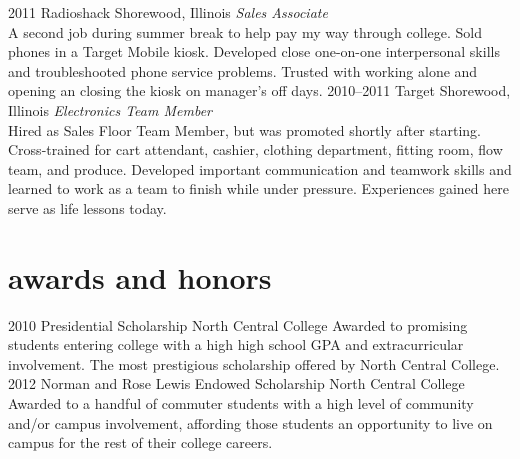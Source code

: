 \documentclass[]{friggeri-cv} %
\begin{document}
\begin{entrylist}
\entry
{2011}
{Radioshack}
{Shorewood, Illinois}
{\emph{Sales Associate} \\
A second job during summer break to help pay my way through college.
Sold phones in a Target Mobile kiosk.
Developed close one-on-one interpersonal skills and troubleshooted phone service problems.
Trusted with working alone and opening an closing the kiosk on manager's off days.}
\entry
{2010--2011}
{Target}
{Shorewood, Illinois}
{\emph{Electronics Team Member} \\
Hired as Sales Floor Team Member, but was promoted shortly after starting. Cross-trained for cart attendant, cashier, clothing department, fitting room, flow team, and produce.
Developed important communication and teamwork skills and learned to work as a team to finish while under pressure.
Experiences gained here serve as life lessons today.}
\end{entrylist}


\section{awards and honors}

\begin{entrylist}
\entry
{2010}
{Presidential Scholarship}
{North Central College}
{Awarded to promising students entering college with a high high
school GPA and extracurricular involvement.
The most prestigious scholarship offered by North Central College.}
\entry
{2012}
{Norman and Rose Lewis Endowed Scholarship}
{North Central College}
{Awarded to a handful of commuter students with a high level of community and/or campus involvement, affording those students an opportunity to live on campus for the rest of their college careers.}
\end{entrylist}

\end{document}
